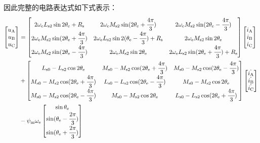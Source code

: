 因此完整的电路表达式如下式表示：
\begin{align*}
    \begin{bmatrix}
        u_{\mathrm{A}} \\ u_{\mathrm{B}} \\ u_{\mathrm{C}}
    \end{bmatrix} &=
    \begin{bmatrix}
        2\omega_{\mathrm{e}}L_{\mathrm{s}2}\sin2\theta_{\mathrm{e}}+R_{\mathrm{s}}
        & 2\omega_{\mathrm{e}}M_{\mathrm{s}2}\sin(2\theta_{\mathrm{e}}+\cfrac{4\pi}{3})
        & 2\omega_{\mathrm{e}}M_{\mathrm{s}2}\sin(2\theta_{\mathrm{e}}-\cfrac{4\pi}{3})
        \\
        2\omega_{\mathrm{e}}M_{\mathrm{s}2}\sin(2\theta_{\mathrm{e}}+\cfrac{4\pi}{3})
        & 2\omega_{\mathrm{e}}L_{\mathrm{s}2}\sin2(\theta_{\mathrm{e}}-\cfrac{4\pi}{3})+R_{\mathrm{s}}
        & 2\omega_{\mathrm{e}}M_{\mathrm{s}2}\sin2\theta_{\mathrm{e}}
        \\
        2\omega_{\mathrm{e}}M_{\mathrm{s}2}\sin(2\theta_{\mathrm{e}}-\cfrac{4\pi}{3})
        & 2\omega_{\mathrm{e}}M_{\mathrm{s}2}\sin2\theta_{\mathrm{e}}
        & 2\omega_{\mathrm{e}}L_{\mathrm{s}2}\sin(2\theta_{\mathrm{e}}+\cfrac{4\pi}{3})+R_{\mathrm{s}}
    \end{bmatrix}
    \begin{bmatrix}
        i_{\mathrm{A}} \\ i_{\mathrm{B}} \\ i_{\mathrm{C}}
    \end{bmatrix} \\
    & +
    \begin{bmatrix}
        L_{\mathrm{s}0}-L_{\mathrm{s}2}\cos2\theta_{\mathrm{e}}
        & M_{\mathrm{s}0}-M_{\mathrm{s}2}\cos(2\theta_{\mathrm{e}}+\cfrac{4\pi}{3})
        & M_{\mathrm{s}0}-M_{\mathrm{s}2}\cos(2\theta_{\mathrm{e}}-\cfrac{4\pi}{3})
        \\
        M_{\mathrm{s}0}-M_{\mathrm{s}2}\cos(2\theta_{\mathrm{e}}+\cfrac{4\pi}{3})
        & L_{\mathrm{s}0}-L_{\mathrm{s}2}\cos(2\theta_{\mathrm{e}}-\cfrac{4\pi}{3})
        & M_{\mathrm{s}0}-M_{\mathrm{s}2}\cos2\theta_{\mathrm{e}}
        \\
        M_{\mathrm{s}0}-M_{\mathrm{s}2}\cos(2\theta_{\mathrm{e}}-\cfrac{4\pi}{3})
        & M_{\mathrm{s}0}-M_{\mathrm{s}2}\cos2\theta_{\mathrm{e}}
        & L_{\mathrm{s}0}-L_{\mathrm{s}2}\cos(2\theta_{\mathrm{e}}+\cfrac{4\pi}{3})
    \end{bmatrix}
    \begin{bmatrix}
        \dot{i_{\mathrm{A}}} \\ \dot{i_{\mathrm{B}}} \\ \dot{i_{\mathrm{C}}}
    \end{bmatrix} \\
    & -
    \psi_{\mathrm{m}}\omega_{\mathrm{e}}
    \begin{bmatrix}
        \sin\theta_{\mathrm{e}} \\
        \sin(\theta_{\mathrm{e}}-\cfrac{2\pi}{3}) \\
        \sin(\theta_{\mathrm{e}}+\cfrac{2\pi}{3})
    \end{bmatrix}
\end{align*}

